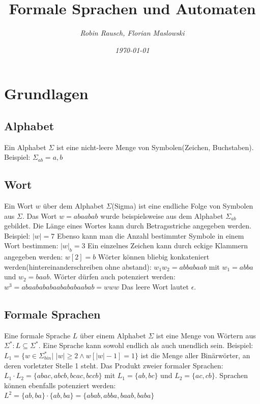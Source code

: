 \documentclass[12pt,a4paper]{article}
\title{Formale Sprachen und Automaten}
\author{\slshape Robin Rausch, Florian Maslowski}
\date{\slshape \today}
\begin{document}
\maketitle
\tableofcontents
\newpage
{}
\section{Grundlagen}
\subsection{Alphabet}
Ein Alphabet $\varSigma$ ist eine nicht-leere Menge von Symbolen(Zeichen, Buchstaben).
Beispiel: $\varSigma_{ab} = { a, b }$

\subsection{Wort}
Ein Wort $w$ über dem Alphabet $\varSigma$(Sigma) ist eine endliche Folge von Symbolen aus $\varSigma$. Das Wort $w = abaabab$ wurde beispielsweise aus dem Alphabet $\varSigma_{ab}$ gebildet.\newline
Die Länge eines Wortes kann durch Betragsstriche angegeben werden. Beispiel: $|w| = 7$\newline
Ebenso kann man die Anzahl bestimmter Symbole in einem Wort bestimmen: $|w|_b = 3$\newline
Ein einzelnes Zeichen kann durch eckige Klammern angegeben werden: $w[2] = b$\newline
Wörter können bliebig konkateniert werden(hintereinanderschreiben ohne abstand): $w_1w_2 = abbabaab$ mit $w_1 = abba$ und $w_2 = baab$.\newline
Wörter dürfen auch potenziert werden: $w^3 = abaabababaabababaabab = www$\newline
Das leere Wort lautet $\epsilon$.

\subsection{Formale Sprachen}
Eine formale Sprache $L$ über einem Alphabet $\varSigma$ ist eine Menge von Wörtern aus $\varSigma^*: L \subseteq \varSigma^*$. Eine Sprache kann sowohl endlich als auch unendlich sein.\newline
Beispiel: $L_1 = \{w \in \varSigma_{bin}^* |$ $|w| \geqslant 2 \wedge w[|w| - 1] = 1\}$ ist die Menge aller Binärwörter, an deren vorletzter Stelle 1 steht.\newline
Das Produkt zweier formaler Sprachen: $L_1 \cdot L_2 = \{abac, abcb, bcac, bccb\}$ mit $L_1 = \{ab, bc\}$ und $L_2 = \{ ac, cb\}$.\newline
Sprachen können ebenfalls potenziert werden: $L^2 = \{ab, ba\} \cdot \{ab, ba\} = \{ abab, abba, baab, baba\}$
\end{document}
